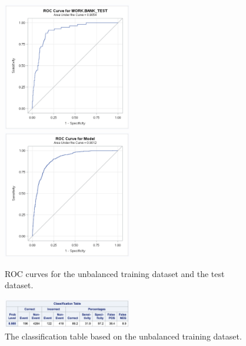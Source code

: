 \documentclass[]{article}
\begin{document}
\begin{figure}
  \centering
    \includegraphics[width=0.5\textwidth]{images/fig25a_ROC.png} 
    \includegraphics[width=0.5\textwidth]{images/fig25b_ROC.png}
  \caption{ROC curves for the unbalanced training dataset and the test dataset.}
  \label{fig25}
\end{figure}

\begin{figure}
  \centering
    \includegraphics[width=0.5\textwidth]{images/fig26_ctable.png} 
  \caption{The classification table based on the unbalanced training dataset.}
  \label{fig26}
\end{figure}
\end{document}
